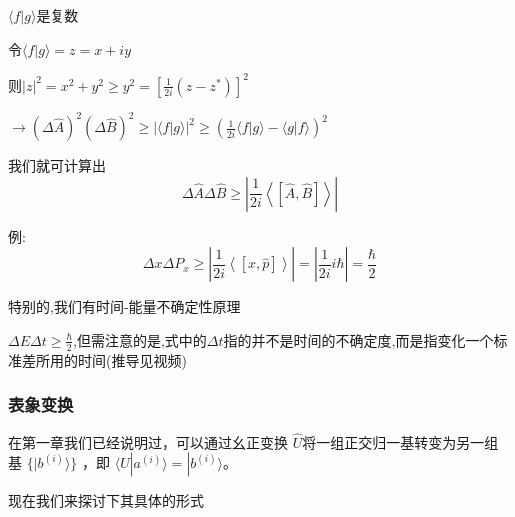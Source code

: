 \documentclass[lang=cn,10pt]{elegantbook}
\begin{document}
$\langle f|g\rangle$是复数

令$\langle f|g\rangle=z=x+iy$

则$|z|^2=x^2+y^2\ge y^2=[\frac{1}{2i}(z-z^*)]^2 $

$\rightarrow\left( \varDelta \hat{A} \right) ^2\left( \varDelta \hat{B} \right) ^2\ge |\langle f|g\rangle |^2\ge \left( \frac{1}{2i}\langle f|g\rangle -\langle g|f\rangle \right) ^2$

我们就可计算出
\begin{equation*}
	\varDelta \hat{A}\varDelta \hat{B}\ge |\frac{1}{2i}\left< \left[ \hat{A},\hat{B} \right] \right> |
\end{equation*}

例:
\begin{equation*}
	\varDelta x\varDelta P_x\ge |\frac{1}{2i}\left< \left[ x,\hat{p} \right] \right> |=|\frac{1}{2i}i\hbar |=\frac{\hbar}{2}
\end{equation*}

特别的,我们有时间-能量不确定性原理

$\varDelta E\varDelta t\ge \frac{\hbar}{2}$,但需注意的是,式中的$\varDelta t$指的并不是时间的不确定度,而是指变化一个标准差所用的时间(推导见视频)
\subsubsection{表象变换}
在第一章我们已经说明过，可以通过幺正变换 $\hat{U}$将一组正交归一基转变为另一组基 $\{ |b^{(i)}\rangle \}$ ，即 $\langle U  |a^{(i)}\rangle =  |b^{(i)}\rangle$。

现在我们来探讨下其具体的形式
\end{document}
